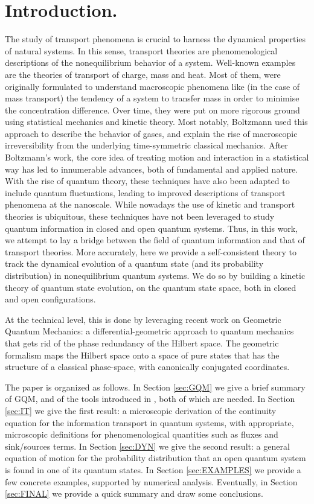 \documentclass[draft,nofootinbib,pre,twocolumn,showpacs,showkeys,preprintnumbers,floatfix]{revtex4-1}
\newcommand{\1}{\mathbbm{1}}
\begin{document}
\section*{Introduction.} The study of transport phenomena is crucial to harness 
the dynamical properties of natural systems. In this sense, transport theories are 
phenomenological descriptions of the nonequilibrium behavior of a system. Well-known 
examples are the theories of transport of charge, mass and heat. Most of them, were 
originally formulated to understand macroscopic phenomena like (in the case of 
mass transport) the tendency of a system to transfer mass in order to minimise the 
concentration difference. Over time, they were put on more rigorous ground using 
statistical mechanics and kinetic theory. Most notably, Boltzmann used this approach
to describe the behavior of gases, and explain the rise of macroscopic irreversibility from 
the underlying time-symmetric classical mechanics. After Boltzmann's work, the core idea 
of treating motion and interaction in a statistical way has led to innumerable advances, both 
of fundamental and applied nature. With the rise of quantum theory, these techniques have 
also been adapted to include quantum fluctuations, leading to improved descriptions of 
transport phenomena at the nanoscale.
While nowadays the use of kinetic and transport theories is ubiquitous, these techniques
have not been leveraged to study quantum information in closed and open quantum systems. 
Thus, in this work, we attempt to lay a bridge between the field of quantum information and 
that of transport theories. More accurately, here we provide a self-consistent theory to track
the dynamical evolution of a quantum state (and its probability distribution) in nonequilibrium
quantum systems. We do so by building a kinetic theory of quantum state evolution, on the quantum 
state space, both in closed and open configurations.

At the technical level, this is done by leveraging recent work \cite{Anza2020a,Anza2020b} on 
Geometric Quantum Mechanics: a differential-geometric approach to quantum mechanics that 
gets rid of the phase redundancy of the Hilbert space. The geometric formalism maps the Hilbert 
space onto a space of pure states that has the structure of a classical phase-space, with 
canonically conjugated coordinates.

The paper is organized as follows. In Section \ref{sec:GQM} we give a brief summary of 
GQM, and of the tools introduced in \cite{Anza2020a,Anza2020b}, both of which are needed.
In Section \ref{sec:IT} we give the first result: a microscopic derivation of the continuity equation 
for the information transport in quantum systems, with appropriate, microscopic definitions for 
phenomenological quantities such as fluxes and sink/sources terms. In Section \ref{sec:DYN}
we give the second result: a general equation of motion for the probability distribution that an open
quantum system is found in one of its quantum states. In Section \ref{sec:EXAMPLES} we provide
a few concrete examples, supported by numerical analysis. Eventually, in Section \ref{sec:FINAL}
we provide a quick summary and draw some conclusions.
 
\end{document}
